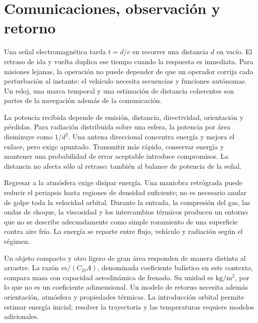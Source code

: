 \section{Comunicaciones, observación y retorno}
Una señal electromagnética tarda $t=d/c$ en recorrer una distancia $d$ en vacío. El retraso de ida y vuelta duplica ese tiempo cuando la respuesta es inmediata. Para misiones lejanas, la operación no puede depender de que un operador corrija cada perturbación al instante: el vehículo necesita secuencias y funciones autónomas. Un reloj, una marca temporal y una estimación de distancia coherentes son partes de la navegación además de la comunicación.

La potencia recibida depende de emisión, distancia, directividad, orientación y pérdidas. Para radiación distribuida sobre una esfera, la potencia por área disminuye como $1/d^2$. Una antena direccional concentra energía y mejora el enlace, pero exige apuntado. Transmitir más rápido, conservar energía y mantener una probabilidad de error aceptable introduce compromisos. La distancia no afecta sólo al retraso: también al balance de potencia de la señal.

Regresar a la atmósfera exige disipar energía. Una maniobra retrógrada puede reducir el periapsis hasta regiones de densidad suficiente; no es necesario anular de golpe toda la velocidad orbital. Durante la entrada, la compresión del gas, las ondas de choque, la viscosidad y los intercambios térmicos producen un entorno que no se describe adecuadamente como simple rozamiento de una superficie contra aire frío. La energía se reparte entre flujo, vehículo y radiación según el régimen.

Un objeto compacto y otro ligero de gran área responden de manera distinta al arrastre. La razón $m/(C_DA)$, denominada coeficiente balístico en este contexto, compara masa con capacidad aerodinámica de frenado. Su unidad es $\mathrm{kg/m^2}$, por lo que no es un coeficiente adimensional. Un modelo de retorno necesita además orientación, atmósfera y propiedades térmicas. La introducción orbital permite estimar energía inicial; resolver la trayectoria y las temperaturas requiere modelos adicionales.

